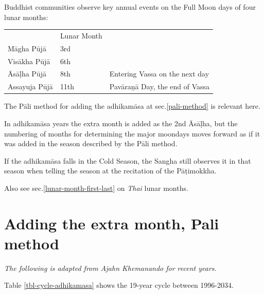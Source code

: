 \documentclass[11pt,oneside]{memoir-article}
\begin{document}
Buddhist communities observe key annual events on the Full Moon
days of four lunar months:

\begin{center}
\begin{tabular}{lll}
 & Lunar Month & \\
Māgha Pūjā & 3rd & \\
Visākha Pūjā & 6th & \\
Āsāḷha Pūjā & 8th & Entering Vassa on the next day\\
Assayuja Pūjā & 11th & Pavāraṇā Day, the end of Vassa\\
\end{tabular}
\end{center}

The Pāli method for adding the adhikamāsa at sec.\ref{pali-method} is
relevant here.

In adhikamāsa years the extra month is added as the 2nd Āsāḷha, but
the numbering of months for determining the major moondays moves
forward as if it was added in the season described by the Pāli method.

If the adhikamāsa falls in the Cold Season, the Sangha still observes
it in that season when telling the season at the recitation of the
Pāṭimokkha.

Also see sec.\ref{lunar-month-first-last} on \emph{Thai} lunar months.

\clearpage
\chapter{Adding the extra month, Pali method}
\label{sec-3}
\label{pali-method}

\emph{The following is adapted from Ajahn Khemanando for recent
years.}\cite{khemanando-adhikamasa}

Table \ref{tbl-cycle-adhikamasa} shows the 19-year cycle between
1996-2034.
\end{document}
